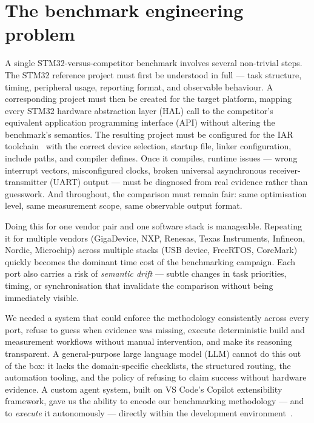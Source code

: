 \section{The benchmark engineering problem}
\label{sec:agent-problem}

A single STM32-versus-competitor benchmark involves several non-trivial steps. The STM32
reference project must first be understood in full --- task structure, timing, peripheral
usage, reporting format, and observable behaviour. A corresponding project must then be
created for the target platform, mapping every STM32 hardware abstraction layer (HAL) call
to the competitor's equivalent application programming interface (API) without altering the
benchmark's semantics. The resulting project must be configured for the IAR
toolchain~\cite{iar-ewarm} with the correct device selection, startup file, linker
configuration, include paths, and compiler defines. Once it compiles, runtime issues --- wrong interrupt vectors,
misconfigured clocks, broken universal asynchronous receiver-transmitter (UART) output ---
must be diagnosed from real evidence rather than guesswork. And throughout, the comparison
must remain fair: same optimisation level, same measurement scope, same observable output
format.

Doing this for one vendor pair and one software stack is manageable. Repeating it for
multiple vendors (GigaDevice, NXP, Renesas, Texas Instruments, Infineon, Nordic,
Microchip) across multiple stacks (USB device, FreeRTOS, CoreMark) quickly becomes the
dominant time cost of the benchmarking campaign. Each port also carries a risk of
\emph{semantic drift} --- subtle changes in task priorities, timing, or synchronisation
that invalidate the comparison without being immediately visible.

We needed a system that could enforce the methodology consistently across every port,
refuse to guess when evidence was missing, execute deterministic build and measurement
workflows without manual intervention, and make its reasoning transparent. A
general-purpose large language model (LLM) cannot do this out of the box: it lacks the
domain-specific checklists, the structured routing, the automation tooling, and the policy
of refusing to claim success without hardware evidence. A custom agent system, built on VS
Code's Copilot extensibility framework, gave us the ability to encode our benchmarking
methodology --- and to \emph{execute} it autonomously --- directly within the development
environment~\cite{vscode-agent-mode}.

